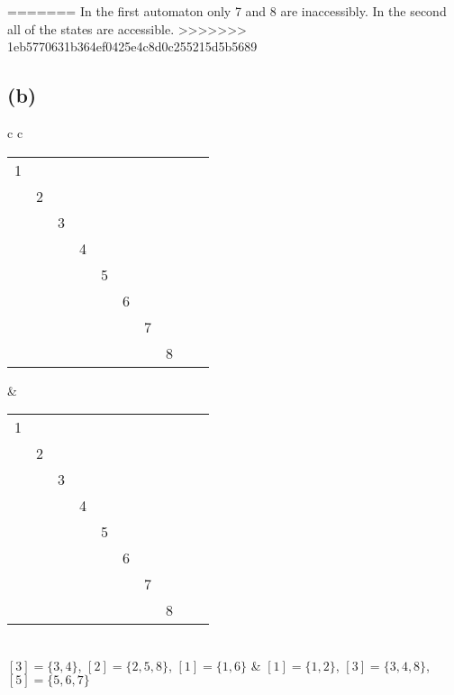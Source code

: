 \documentclass[11pt, a4paper, oneside]{article}
\newcommand{\cmark}{\ding{51}}
\begin{document}
=======
In the first automaton only 7 and 8 are inaccessibly. In the second all of the
states are accessible.
>>>>>>> 1eb5770631b364ef0425e4c8d0c255215d5b5689
\subsection*{(b)}
\begin{tabular}{c c}
\begin{tabular}{*{10}{c}}
\hline
1 \\
\cmark & 2 \\
\cmark & \cmark & 3 \\
\cmark & \cmark & & 4 \\
\cmark & & \cmark & \cmark & 5 \\
 		   & \cmark & \cmark & \cmark & \cmark & 6 \\
\cmark & \cmark & \cmark & \cmark & \cmark & \cmark & 7 \\
\cmark & & \cmark & \cmark & & \cmark & \cmark & 8 \\
\hline
\end{tabular}
&
\begin{tabular}{*{10}{c}}
\hline
1 \\
 & 2 \\
\cmark & \cmark & 3 \\
\cmark & \cmark & & 4 \\
\cmark & \cmark & \cmark & \cmark & 5 \\
\cmark & \cmark & \cmark & \cmark & & 6 \\
\cmark & \cmark & \cmark & \cmark & & & 7 \\
\cmark & \cmark & & & \cmark & \cmark & \cmark & 8 \\
\hline
\end{tabular}
\\
$[3] = \{3,4\}$, $[2] = \{2,5,8\}$, $[1] = \{1,6\}$
&
$[1] = \{1,2\}$, $[3] = \{3,4,8\}$, $[5] = \{5,6,7\}$
\end{tabular}
\end{document}
